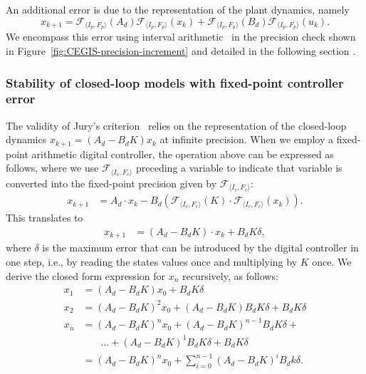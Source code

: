 An additional error is due to the representation of the plant dynamics, namely 
%
\begin{equation*}
x_{k+1} =\mathcal{F}_{\langle I_p,F_p \rangle}(A_d) \mathcal{F}_{\langle I_p,F_p \rangle}(x_{k}) + \mathcal{F}_{\langle I_p,F_p \rangle}(B_d)\mathcal{F}_{\langle I_p,F_p \rangle}(u_{k}).
\end{equation*}
We encompass this error using interval arithmetic~\cite{moore1966interval} in the precision check shown in Figure~\ref{fig:CEGIS-precision-increment} and detailed in the following section .


\subsubsection{Stability of closed-loop models with fixed-point controller error}
\label{sec:stab_FWL}
The validity of Jury's criterion~\cite{fadali} relies on the representation of the closed-loop dynamics $x_{k+1} = (A_d - B_dK) x_k$ at infinite precision.  
When we employ a fixed-point arithmetic digital controller, the operation above can be expressed as follows, where we use $\mathcal{F}_{\langle I_c,F_c \rangle}$ preceding a variable to indicate that variable is converted into the fixed-point precision given by $\mathcal{F}_{\langle I_c,F_c \rangle}$: 
%
\begin{align*}
x_{k+1} &= A_d \cdot x_{k} -B_d(\mathcal{F}_{\langle I_c,F_c \rangle}(K)\cdot\mathcal{F}_{\langle I_c,F_c \rangle}(x_{k})).  
\end{align*}
This translates to 
\begin{align*}
x_{k+1} &= (A_d  - B_dK) \cdot x_k + B_dK\delta, 
\end{align*}
%
where $\delta$ is the maximum error that can be introduced by the digital controller in one step, 
i.e., by reading the states values once and multiplying by $K$ once.  
We derive the closed form expression for $x_n$ recursively, as follows:
%
\begin{align*}
x_{1} &= (A_d  - B_dK)x_0 + B_dK\delta \\
x_{2} %
 &=(A_d  - B_dK)^2x_0 + (A_d  - B_dK)B_dK\delta + B_dK\delta \\
x_{n} &= (A_d  - B_dK)^nx_0 + (A_d  - B_dK)^{n-1}B_dK\delta +\\
&\phantom{{}=1} ... + (A_d  - B_dK)^1B_dK \delta + B_dK\delta \\
  &= (A_d - B_dK)^nx_0 + \sum_{i=0}^{n-1}(A_d - B_dK)^iB_dk\delta. 
\end{align*}
